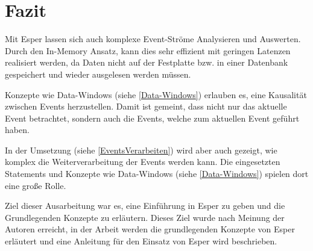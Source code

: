 \chapter{Fazit}
Mit Esper lassen sich auch komplexe Event-Ströme Analysieren und Auswerten. Durch den In-Memory Ansatz, kann dies sehr effizient mit geringen Latenzen realisiert werden,
da Daten nicht auf der Festplatte bzw. in einer Datenbank gespeichert und wieder ausgelesen werden müssen.

Konzepte wie Data-Windows (siehe \ref{Data-Windows}) erlauben es, eine Kausalität zwischen Events herzustellen.
Damit ist gemeint, dass nicht nur das aktuelle Event betrachtet, sondern auch die Events, welche zum aktuellen Event geführt haben.

In der Umsetzung (siehe \ref{EventsVerarbeiten}) wird aber auch gezeigt, wie komplex die Weiterverarbeitung der Events werden kann. Die eingesetzten Statements und Konzepte wie Data-Windows (siehe \ref{Data-Windows}) spielen dort eine große Rolle.

Ziel dieser Ausarbeitung war es, eine Einführung in Esper zu geben und die Grundlegenden Konzepte zu erläutern. Dieses Ziel wurde nach Meinung der Autoren erreicht, in der Arbeit werden die grundlegenden Konzepte von Esper erläutert und eine Anleitung für den Einsatz von Esper wird beschrieben.